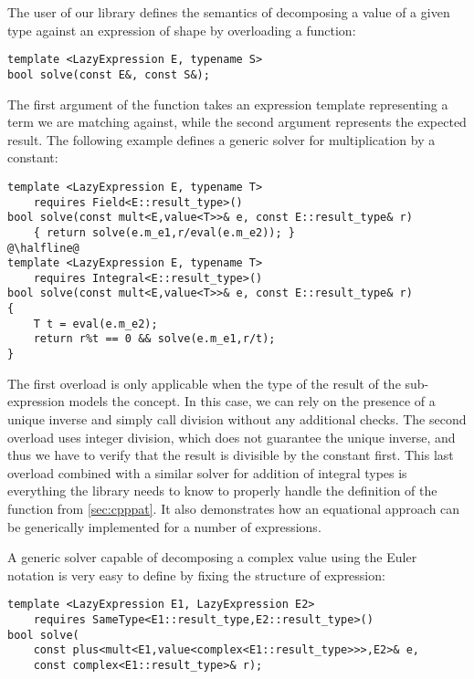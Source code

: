 
\noindent
The user of our library defines the semantics of decomposing a value of a given 
type  against an expression of shape  by overloading a function: 

\begin{lstlisting}
template <LazyExpression E, typename S> 
bool solve(const E&, const S&);
\end{lstlisting}

\noindent
The first argument of the function takes an expression template representing a 
term we are matching against, while the second argument represents the expected 
result. The following example defines a generic solver for multiplication by a 
constant:

\begin{lstlisting}
template <LazyExpression E, typename T> 
    requires Field<E::result_type>()
bool solve(const mult<E,value<T>>& e, const E::result_type& r)
    { return solve(e.m_e1,r/eval(e.m_e2)); }
@\halfline@
template <LazyExpression E, typename T>
    requires Integral<E::result_type>()
bool solve(const mult<E,value<T>>& e, const E::result_type& r) 
{
    T t = eval(e.m_e2);
    return r%t == 0 && solve(e.m_e1,r/t);
}
\end{lstlisting}

\noindent
The first overload is only applicable when the type of the result of the 
sub-expression models the  concept. In this case, we can rely on the 
presence of a unique inverse and simply call division without any additional 
checks. The second overload uses integer division, which does not guarantee the 
unique inverse, and thus we have to verify that the result is divisible by the 
constant first. This last overload combined with a similar solver for addition 
of integral types is everything the library needs to know to properly handle the 
definition of the  function from \textsection\ref{sec:cpppat}. It also 
demonstrates how an equational approach can be generically implemented for a 
number of expressions.

A generic solver capable of decomposing a complex value using the Euler 
notation is very easy to define by fixing the structure of expression:

\begin{lstlisting}[keepspaces]
template <LazyExpression E1, LazyExpression E2> 
    requires SameType<E1::result_type,E2::result_type>()
bool solve(
    const plus<mult<E1,value<complex<E1::result_type>>>,E2>& e, 
    const complex<E1::result_type>& r);
\end{lstlisting}

